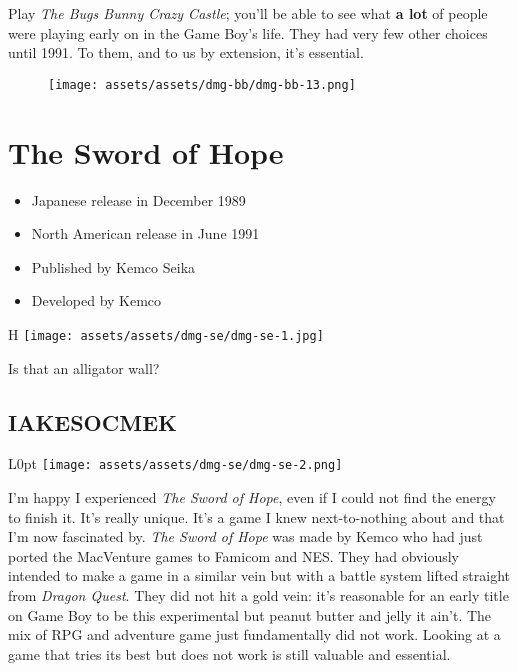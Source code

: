 \documentclass{book}
\begin{document}
Play \emph{The Bugs Bunny Crazy Castle}; you’ll be able to see what \textbf{a lot} of people were playing early on in the Game Boy’s life. They had very few other choices until 1991. To them, and to us by extension, it’s essential.

\begin{figure}[hbt]
\vskip 10pt
\centering \texttt{[image: assets/assets/dmg-bb/dmg-bb-13.png]}
\vskip 6pt
\end{figure}


\begingroup \chapter*{The Sword of Hope} \endgroup

\begin{itemize} \setlength\itemsep{-0.4em}
\item Japanese release in December 1989
\item North American release in June 1991
\item Published by Kemco Seika
\item Developed by Kemco
\end{itemize}\noindent

\begin{wrapfigure}{H}{\linewidth}
\vskip 4pt
\centering \texttt{[image: assets/assets/dmg-se/dmg-se-1.jpg]}\par\pagetwodescription Is that an alligator wall?\end{wrapfigure}
\clearpage

\FloatBarrier\needspace{10mm}\section*{IAKESOCMEK}\nopagebreak[4]

\begin{wrapfigure}{L}{0pt} \texttt{[image: assets/assets/dmg-se/dmg-se-2.png]}\end{wrapfigure}
I’m happy I experienced \emph{The Sword of Hope}, even if I could not find the energy to finish it. It’s really unique. It’s a game I knew next-to-nothing about and that I’m now fascinated by. \emph{The Sword of Hope} was made by Kemco who had just ported the MacVenture games to Famicom and NES. They had obviously intended to make a game in a similar vein but with a battle system lifted straight from \emph{Dragon Quest}. They did not hit a gold vein: it’s reasonable for an early title on Game Boy to be this experimental but peanut butter and jelly it ain’t. The mix of RPG and adventure game just fundamentally did not work. Looking at a game that tries its best but does not work is still valuable and essential.
\end{document}
